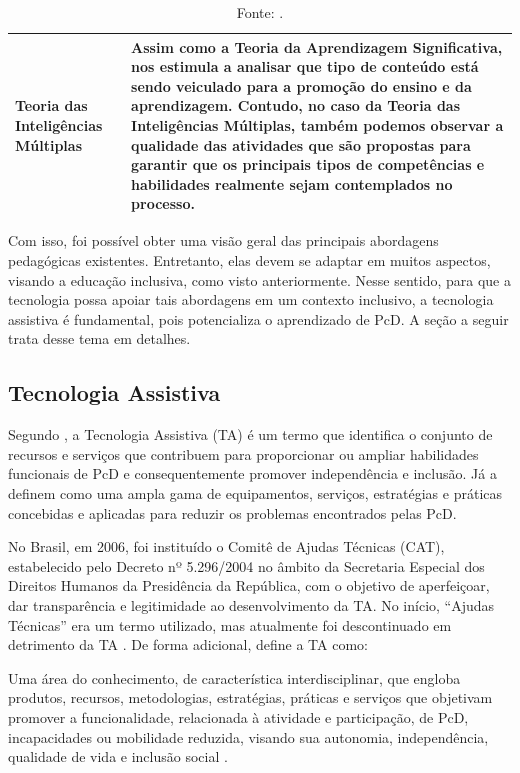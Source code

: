 \begin{table}[htbp]
\begin{tabularx}{\textwidth}{p{3.5cm}|X}
Teoria das Inteligências Múltiplas & Assim como a Teoria da Aprendizagem Significativa, nos estimula a analisar que tipo de conteúdo está sendo veiculado para a promoção do ensino e da aprendizagem. Contudo, no caso da Teoria das Inteligências Múltiplas, também podemos observar a qualidade das atividades que são propostas para garantir que os principais tipos de competências e habilidades realmente sejam contemplados no processo. \\ \hline
\end{tabularx}
\caption*{Fonte: .}
\end{table}

Com isso, foi possível obter uma visão geral das principais abordagens pedagógicas existentes. Entretanto, elas devem se adaptar em muitos aspectos, visando a educação inclusiva, como visto anteriormente. Nesse sentido, para que a tecnologia possa apoiar tais abordagens em um contexto inclusivo, a tecnologia assistiva é fundamental, pois potencializa o aprendizado de PcD. A seção a seguir trata desse tema em detalhes.

\subsection{Tecnologia Assistiva}
\label{fundamentacao-teorica:tic:assistiva}

Segundo , a Tecnologia Assistiva (TA) é um termo que identifica o conjunto de recursos e serviços que contribuem para proporcionar ou ampliar habilidades funcionais de PcD e consequentemente promover independência e inclusão. Já  a definem como uma ampla gama de equipamentos, serviços, estratégias e práticas concebidas e aplicadas para reduzir os problemas encontrados pelas PcD.

No Brasil, em 2006, foi instituído o Comitê de Ajudas Técnicas (CAT), estabelecido pelo Decreto nº 5.296/2004 no âmbito da Secretaria Especial dos Direitos Humanos da Presidência da República, com o objetivo de aperfeiçoar, dar transparência e legitimidade ao desenvolvimento da TA. No início, ``Ajudas Técnicas'' era um termo utilizado, mas atualmente foi descontinuado em detrimento da TA \cite{Cat2008}. De forma adicional,  define a TA como:

\begin{citacao}
Uma área do conhecimento, de característica interdisciplinar, que engloba produtos, recursos, metodologias, estratégias, práticas e serviços que objetivam promover a funcionalidade, relacionada à atividade e participação, de PcD, incapacidades ou mobilidade reduzida, visando sua autonomia, independência, qualidade de vida e inclusão social \cite{Cat2008}.
\end{citacao}

